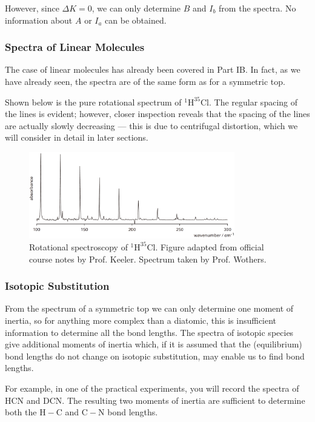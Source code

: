 \documentclass{article}
\theoremstyle{plain}\theoremheaderfont{\normalfont\itshape}\theorembodyfont{\rmfamily}\theoremseparator{.}\newtheorem*{rem}{Remark}\newtheorem*{ex}{Example}\newtheorem*{proof}{Proof}\newtheorem*{altp}{Alternative proof}
\theoremstyle{plain}\theoremheaderfont{\normalfont\bfseries}\theorembodyfont{\rmfamily}\theoremseparator{.}\newtheorem{thm}{Theorem}[section]\newtheorem{lem}[thm]{Lemma}\newtheorem{prop}[thm]{Proposition}\newtheorem*{cor}{Corollary}\newtheorem{defn}[thm]{Definition}\newtheorem{clm}[thm]{Claim}\newtheorem{clminproof}{Claim}\newtheorem{pos}{Postulate}[section]
\theoremstyle{break}\theoremheaderfont{\normalfont\itshape}\theorembodyfont{\rmfamily}\theoremseparator{.\medskip}\newtheorem*{proofskip}{Proof}\newtheorem*{exs}{Examples}\newtheorem*{rems}{Remarks}
\theoremstyle{break}\theoremheaderfont{\normalfont\bfseries}\theorembodyfont{\rmfamily}\theoremseparator{.\medskip}\newtheorem{lemskip}[thm]{Lemma}\newtheorem{defnskip}[thm]{Definition}\newtheorem{propskip}[thm]{Proposition}\newtheorem{thmskip}[thm]{Theorem}
\numberwithin{equation}{section}
\begin{document}
    However, since \(\Delta K=0\), we can only determine \(B\) and \(I_b\) from the spectra. No information about \(A\) or \(I_a\) can be obtained.
    \subsubsection{Spectra of Linear Molecules}
    The case of linear molecules has already been covered in Part IB. In fact, as we have already seen, the spectra are of the same form as for a symmetric top.

    Shown below is the pure rotational spectrum of \(\mathrm{^1H^{35}Cl}\). The regular spacing of the lines is evident; however, closer inspection reveals that the spacing of the lines are actually slowly decreasing --- this is due to centrifugal distortion, which we will consider in detail in later sections.

    \begin{figure}[ht!]
        \centering
        \includegraphics[width=0.8\textwidth]{HCl_microwave.png}
        \caption{Rotational spectroscopy of \(\mathrm{^1H^{35}Cl}\). Figure adapted from official course notes by Prof. Keeler. Spectrum taken by Prof. Wothers.}
    \end{figure}

    \subsubsection{Isotopic Substitution}
    From the spectrum of a symmetric top we can only determine one moment of inertia, so for anything more complex than a diatomic, this is insufficient information to determine all the bond lengths. The spectra of isotopic species give additional moments of inertia which, if it is assumed that the (equilibrium) bond lengths do not change on isotopic substitution, may enable us to find bond lengths.

    For example, in one of the practical experiments, you will record the spectra of \(\mathrm{HCN}\) and \(\mathrm{DCN}\). The resulting two moments of inertia are sufficient to determine both the \(\mathrm{H-C}\) and \(\mathrm{C-N}\) bond lengths.
\end{document}

